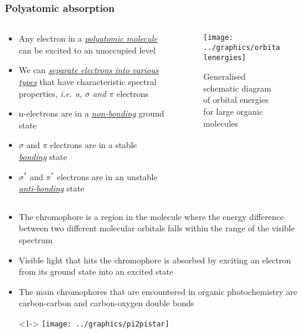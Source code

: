 \documentclass[ignorenonframetext]{beamer}
\begin{document}
\begin{frame}
\frametitle{Polyatomic absorption}
\begin{columns}[onlytextwidth,T]
\begin{column}{.6\textwidth}
\begin{itemize}[<+->]
\item Any electron in a \emph{\underline{polyatomic molecule}} can be excited to an unoccupied level
\item We can \emph{\underline{separate electrons into various types}} that have characteristic spectral properties, \textit{i.e. n, \(\sigma\) and \(\pi\)} electrons
\item n-electrons are in a \emph{\underline{non-bonding}} ground state
\item \(\sigma\) and \(\pi\) electrons are in a stable \emph{\underline{bonding}} state
\item \(\sigma^*\) and \(\pi^*\) electrons are in an unstable \emph{\underline{anti-bonding}} state
\end{itemize}
\end{column}
\begin{column}{.4\textwidth}
\begin{figure}[h!]
\texttt{[image: ../graphics/orbitalenergies]}
\caption{Generalised schematic diagram of orbital energies for large organic molecules}
\end{figure}
\end{column}
\end{columns}
\end{frame}

\begin{frame}[<+->]
\begin{itemize}
\item The {\color{red} chromophore} is a region in the molecule where the energy difference between two different molecular orbitals falls within the range of the visible spectrum
\item Visible light that hits the chromophore is absorbed by exciting an electron from its ground state into an excited state
\item The main chromophores that are encountered in organic photochemistry are {\color{red} carbon-carbon} and {\color{red} carbon-oxygen} double bonds
\item[]<1-> \texttt{[image: ../graphics/pi2pistar]}
\end{itemize}
\end{frame}
\end{document}
